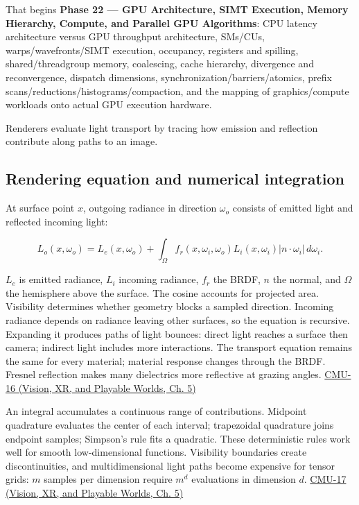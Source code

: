 \hypertarget{03-visual-computing-i-ch011-next-pass-9-m127-m128-m129-parts-21012156}{}

That begins \textbf{Phase 22 --- GPU Architecture, SIMT Execution, Memory Hierarchy, Compute, and Parallel GPU Algorithms}: CPU latency architecture versus GPU throughput architecture, SMs/CUs, warps/wavefronts/SIMT execution, occupancy, registers and spilling, shared/threadgroup memory, coalescing, cache hierarchy, divergence and reconvergence, dispatch dimensions, synchronization/barriers/atomics, prefix scans/reductions/histograms/compaction, and the mapping of graphics/compute workloads onto actual GPU execution hardware.

Renderers evaluate light transport by tracing how emission and reflection contribute along paths to an image.

\subsection{Rendering equation and numerical integration}\label{03-visual-computing-i-ch011-rendering-equation-and-numerical-integration}

\hypertarget{03-visual-computing-i-ch011-rendering-equation-and-numerical-integration}{}

At surface point \(x\), outgoing radiance in direction \(\omega_o\) consists of emitted light and reflected incoming light:

\[
L_o(x,\omega_o)=L_e(x,\omega_o)+\int_\Omega f_r(x,\omega_i,\omega_o)L_i(x,\omega_i)|n\cdot\omega_i|\,d\omega_i.
\]

\(L_e\) is emitted radiance, \(L_i\) incoming radiance, \(f_r\) the BRDF, \(n\) the normal, and \(\Omega\) the hemisphere above the surface. The cosine accounts for projected area. Visibility determines whether geometry blocks a sampled direction. Incoming radiance depends on radiance leaving other surfaces, so the equation is recursive. Expanding it produces paths of light bounces: direct light reaches a surface then camera; indirect light includes more interactions. The transport equation remains the same for every material; material response changes through the BRDF. Fresnel reflection makes many dielectrics more reflective at grazing angles. \href{../07-Vision-XR-and-Playable-Worlds/main.pdf\#nameddest=04-visual-computing-ii-ch036-cmu-16---the-rendering-equation}{CMU-16 (Vision, XR, and Playable Worlds, Ch. 5)}

An integral accumulates a continuous range of contributions. Midpoint quadrature evaluates the center of each interval; trapezoidal quadrature joins endpoint samples; Simpson's rule fits a quadratic. These deterministic rules work well for smooth low-dimensional functions. Visibility boundaries create discontinuities, and multidimensional light paths become expensive for tensor grids: \(m\) samples per dimension require \(m^d\) evaluations in dimension \(d\). \href{../07-Vision-XR-and-Playable-Worlds/main.pdf\#nameddest=04-visual-computing-ii-ch036-cmu-17---numerical-integration}{CMU-17 (Vision, XR, and Playable Worlds, Ch. 5)}

